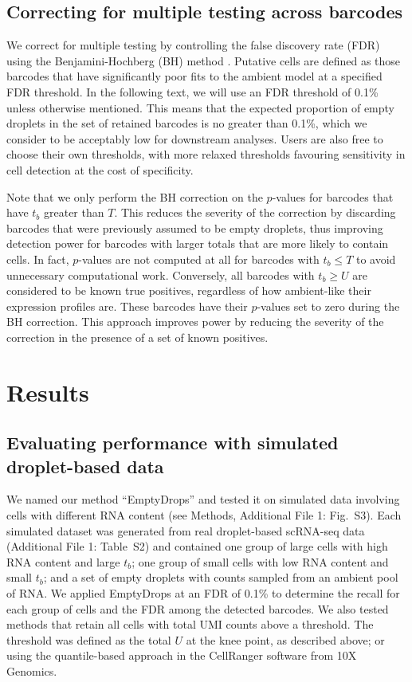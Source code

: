 \documentclass{bmcart}
\newcommand{\ADD}[1]{Additional File 1: #1}
\newcommand{\supptabdataset}{S2}
\newcommand{\suppfigsimdesign}{S3}
\begin{document}
\subsection*{Correcting for multiple testing across barcodes}
We correct for multiple testing by controlling the false discovery rate (FDR) using the Benjamini-Hochberg (BH) method \cite{benjamini1995controlling}.
Putative cells are defined as those barcodes that have significantly poor fits to the ambient model at a specified FDR threshold.
In the following text, we will use an FDR threshold of 0.1\% unless otherwise mentioned.
This means that the expected proportion of empty droplets in the set of retained barcodes is no greater than 0.1\%,
which we consider to be acceptably low for downstream analyses.
Users are also free to choose their own thresholds, with more relaxed thresholds favouring sensitivity in cell detection at the cost of specificity.

Note that we only perform the BH correction on the $p$-values for barcodes that have $t_b$ greater than $T$.
This reduces the severity of the correction by discarding barcodes that were previously assumed to be empty droplets, thus improving detection power for barcodes with larger totals that are more likely to contain cells.
In fact, $p$-values are not computed at all for barcodes with $t_b \le T$ to avoid unnecessary computational work.
Conversely, all barcodes with $t_b \ge U$ are considered to be known true positives, regardless of how ambient-like their expression profiles are.
These barcodes have their $p$-values set to zero during the BH correction.
This approach improves power by reducing the severity of the correction in the presence of a set of known positives.

\section*{Results}

\subsection*{Evaluating performance with simulated droplet-based data}
We named our method ``EmptyDrops'' and tested it on simulated data involving cells with different RNA content (see Methods, \ADD{Fig.~\suppfigsimdesign{}}).
Each simulated dataset was generated from real droplet-based scRNA-seq data (\ADD{Table~\supptabdataset{}}) 
and contained one group of large cells with high RNA content and large $t_b$;
one group of small cells with low RNA content and small $t_b$; 
and a set of empty droplets with counts sampled from an ambient pool of RNA.
We applied EmptyDrops at an FDR of 0.1\% to determine the recall for each group of cells and the FDR among the detected barcodes.
We also tested methods that retain all cells with total UMI counts above a threshold.
The threshold was defined as the total $U$ at the knee point, as described above;
or using the quantile-based approach \cite{zheng2017massively} in the CellRanger software from 10X Genomics.
\end{document}
